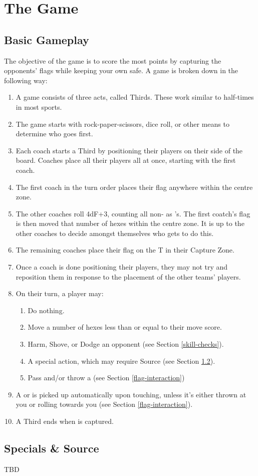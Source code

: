 \chapter{The Game}
\section{Basic Gameplay} \label{basic-gameplay}
The objective of the game is to score the most points by capturing the opponents' flags while keeping your own safe.
A game is broken down in the following way:
\begin{enumerate}
    \item A game consists of three acts, called Thirds.
    These work similar to half-times in most sports.
    \item The game starts with rock-paper-scissors, dice roll, or other means to determine who goes first.
    \item Each coach starts a Third by positioning their players on their side of the board.
    Coaches place all their players all at once, starting with the first coach.
    \item The first coach in the turn order places their flag anywhere within the centre zone.
    \item The other coaches roll 4dF+3, counting all non-\blank{} as \plus{}'s. The first coatch's flag is then moved that number of hexes within the centre zone.
    It is up to the other coaches to decide amongst themselves who gets to do this.
    \item The remaining coaches place their flag on the T in their Capture Zone.
    \item Once a coach is done positioning their players, they may not try and reposition them in response to the placement of the other teams' players.
    \item On their turn, a player may:
    \begin{enumerate}
        \item Do nothing.
        \item Move a number of hexes less than or equal to their move score.
        \item Harm, Shove, or Dodge an opponent (see Section \ref{skill-checks}).
        \item A special action, which may require Source (see Section \ref{energy}).
        \item Pass \ball{} and/or throw a \flag{} (see Section \ref{flag-interaction})
    \end{enumerate}
    \item A \flag{} or \ball{} is picked up automatically upon touching, unless it’s either thrown at you or rolling towards you (see Section \ref{flag-interaction}).
    \item A Third ends when \ball{} is captured.
\end{enumerate}




%
\section{Specials \& Source}\label{energy}
TBD

